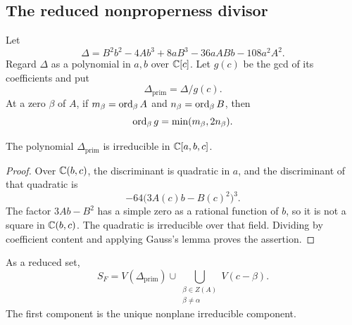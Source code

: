\documentclass[11pt,reqno]{amsart}
\begin{document}
\subsection{The reduced nonproperness divisor}

Let
\[
\Delta=B^2b^2-4Ab^3+8aB^3-36aABb-108a^2A^2.
\]
Regard \(\Delta\) as a polynomial in \(a,b\) over \(\mathbb C[c]\).  Let \(g(c)\)
be the gcd of its coefficients and put
\[
\Delta_{\mathrm{prim}}=\Delta/g(c).
\]
At a zero \(\beta\) of \(A\), if
\(m_\beta=\operatorname{ord}_\beta A\) and \(n_\beta=\operatorname{ord}_\beta B\), then
\[
\operatorname{ord}_\beta g=\min(m_\beta,2n_\beta).
\]

\begin{lemma}
\label{lem:primitive-disc}
The polynomial \(\Delta_{\mathrm{prim}}\) is irreducible in
\(\mathbb C[a,b,c]\).
\end{lemma}

\begin{proof}
Over \(\mathbb C(b,c)\), the discriminant is quadratic in \(a\), and the
discriminant of that quadratic is
\[
-64\bigl(3A(c)b-B(c)^2\bigr)^3.
\]
The factor \(3Ab-B^2\) has a simple zero as a rational function of \(b\),
so it is not a square in \(\mathbb C(b,c)\).  The quadratic is irreducible over
that field.  Dividing by coefficient content and applying Gauss's lemma
proves the assertion.
\end{proof}

\begin{lemma}
\label{lem:nonproper-general}
As a reduced set,
\begin{equation}
\label{eq:general-nonproper}
S_F=V(\Delta_{\mathrm{prim}})
\cup\bigcup_{\substack{\beta\in Z(A)\\\beta\ne\alpha}}V(c-\beta).
\end{equation}
The first component is the unique nonplane irreducible component.
\end{lemma}
\end{document}
